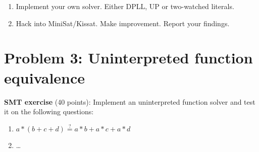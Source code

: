 \documentclass[11pt]{article}
\begin{document}
    \begin{enumerate}
    \item Implement your own solver. Either DPLL, UP or two-watched literals.
    \item Hack into MiniSat/Kissat. Make improvement. Report your findings.
    \end{enumerate}

    \section {Problem 3: Uninterpreted function equivalence}

    \noindent \textbf{SMT exercise} (40 points): Implement an uninterpreted function solver and test it on the following questions:\\

    \begin{enumerate}
    \item $a * (b + c + d) \overset{?}{=} a * b + a * c + a * d$
    \item \ldots
    \end{enumerate}
\end{document}
